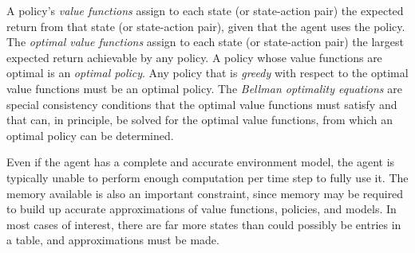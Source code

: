 \documentclass[12pt]{article}
\begin{document}
A policy's \emph{value functions} assign to each state (or state-action pair) the expected return from that state (or state-action pair), given that the agent uses the policy. The \emph{optimal value functions} assign to each state (or state-action pair) the largest expected return achievable by any policy. A policy whose value functions are optimal is an \emph{optimal policy}. Any policy that is \emph{greedy} with respect to the optimal value functions must be an optimal policy. The \emph{Bellman optimality equations} are special consistency conditions that the optimal value functions must satisfy and that can, in principle, be solved for the optimal value functions, from which an optimal policy can be determined.

Even if the agent has a complete and accurate environment model, the agent is typically unable to perform enough computation per time step to fully use it. The memory available is also an important constraint, since memory may be required to build up accurate approximations of value functions, policies, and models. In most cases of interest, there are far more states than could possibly be entries in a table, and approximations must be made. 
\end{document}
